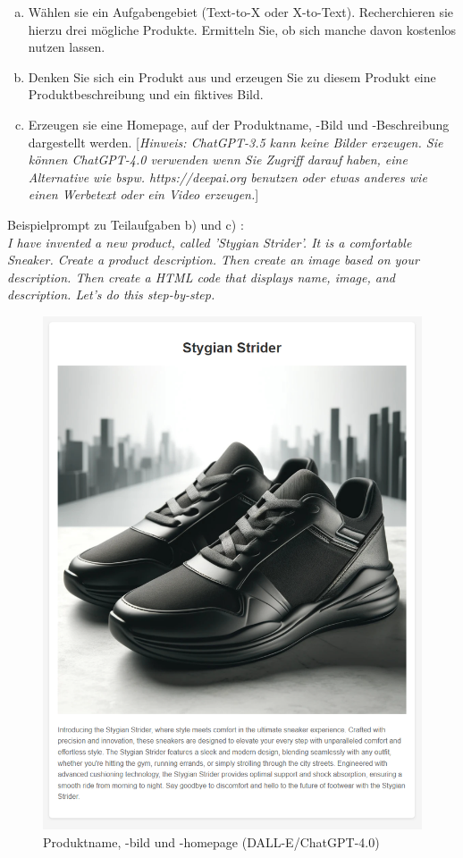 \documentclass[12pt,ngerman]{AssignmentClass}
\begin{document}
        \begin{enumerate}[a)]
            \item Wählen sie ein Aufgabengebiet (Text-to-X oder X-to-Text). Recherchieren sie hierzu drei mögliche Produkte. Ermitteln Sie, ob sich manche davon kostenlos nutzen lassen.
            \item Denken Sie sich ein Produkt aus und erzeugen Sie zu diesem Produkt eine Produktbeschreibung und ein fiktives Bild.
            \item Erzeugen sie eine Homepage, auf der Produktname, -Bild und -Beschreibung dargestellt werden. [\textit{Hinweis: ChatGPT-3.5 kann keine Bilder erzeugen. Sie können ChatGPT-4.0 verwenden wenn Sie Zugriff darauf haben, eine Alternative wie bspw. https://deepai.org benutzen oder etwas anderes wie einen Werbetext oder ein Video erzeugen.}]
        \end{enumerate}
        

        \vspace{5mm}
        \noindent Beispielprompt zu Teilaufgaben b) und c) :\\
        \textit{I have invented a new product, called 'Stygian Strider'. It is a comfortable Sneaker. Create a product description. Then create an image based on your description. Then create a HTML code that displays name, image, and description. Let's do this step-by-step.}

        \begin{figure}
            \centering
            \includegraphics[width=0.5\linewidth]{2024-04-22 10_37_14-Stygian Strider.png}
            \caption{Produktname, -bild und -homepage (DALL-E/ChatGPT-4.0)}
            \label{fig:product}
        \end{figure}
    
\end{document}
